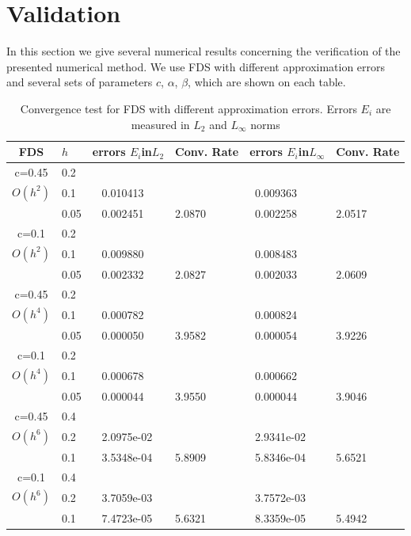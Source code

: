 \documentclass[preprint]{elsarticle}
\begin{document}
\section{Validation}\label{validation}

In this section we give several numerical results concerning the verification of  the presented numerical method. 
 We use FDS with different approximation errors and several sets  of  parameters $c$, $\alpha$, $\beta$,  which are shown on each table. 


\begin{center}
\begin{table}[ht]
\centering
		\begin{tabular}{||c|l|ll|ll||}
			\hline
			\hline
      FDS       & $h$ &errors $E_i$in$L_2$&Conv. Rate& errors $E_i$in$L_\infty$&Conv. Rate\\
   			\hline 
					\hline 
      c=0.45    &0.2    &             &            &           &   \\
   $O(h^2)$     &0.1    &~ 0.010413  &            &~0.009363 &   \\
                &0.05   &~ 0.002451  &2.0870  &~0.002258 & 2.0517 \\
               	 \hline 
     c=0.1      &0.2   &             &           &                & \\
     $O(h^2)$   &0.1   &~ 0.009880  &             &~0.008483      &    \\
                &0.05  &~ 0.002332 & 2.0827       &~0.002033      & 2.0609  \\
			\hline
			\hline 	
      c=0.45    &0.2   &            &            &             &    \\
       $O(h^4)$ &0.1   &~ 0.000782   &           &~0.000824  &   \\
                &0.05  &~ 0.000050 & 3.9582    &~0.000054  & 3.9226  \\
					  			\hline 	
     c=0.1      &0.2  &            &               &               &     \\
     $O(h^4)$  &0.1   &~ 0.000678  &              &~0.000662      &        \\
               &0.05  &~ 0.000044 &3.9550        &~0.000044 &  3.9046        \\
			\hline
    \hline
   c=0.45       &0.4   &            &        &                  &      \\
     $O(h^6)$   &0.2   &~ 2.0975e-02 &           &~2.9341e-02      &       \\
     &0.1  &~ 3.5348e-04 &5.8909  &~5.8346e-04 & 5.6521         \\
	  \hline
   c=0.1       &0.4   &             &        &               &        \\
     $O(h^6)$  &0.2   &~ 3.7059e-03  &        &~3.7572e-03     &       \\
   &0.1  &~ 7.4723e-05 &5.6321  &~8.3359e-05&   5.4942       \\
	   \hline
			\hline 
		\end{tabular}
		\caption{Convergence test for  FDS with different approximation errors. Errors $E_i$ are measured in $L_2$ and $L_\infty$ norms}


\end{table}
\end{center}
\end{document}

